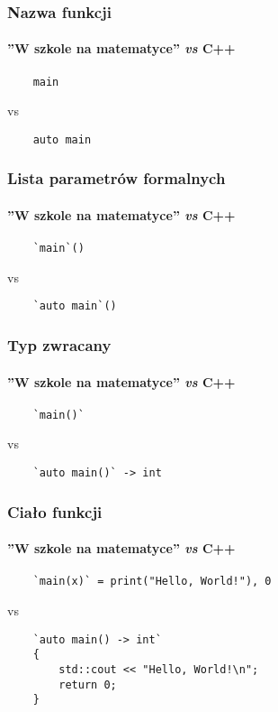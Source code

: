 \documentclass[aspectratio=169]{beamer}
\begin{document}
\begin{frame}[fragile]
    \frametitle{Nazwa funkcji}
    \framesubtitle{''W szkole na matematyce'' \emph{vs} C++}

    {\footnotesize
    \begin{lstlisting}
    main
    \end{lstlisting}}

    vs

    {\footnotesize
    \begin{lstlisting}
    auto main
    \end{lstlisting}}
    \vspace{4em}
\end{frame}

\begin{frame}[fragile]
    \frametitle{Lista parametrów formalnych}
    \framesubtitle{''W szkole na matematyce'' \emph{vs} C++}

    {\footnotesize
    \begin{lstlisting}
    `main`()
    \end{lstlisting}}

    vs

    {\footnotesize
    \begin{lstlisting}
    `auto main`()
    \end{lstlisting}}
    \vspace{4em}
\end{frame}

\begin{frame}[fragile]
    \frametitle{Typ zwracany}
    \framesubtitle{''W szkole na matematyce'' \emph{vs} C++}

    {\footnotesize
    \begin{lstlisting}
    `main()`
    \end{lstlisting}}

    vs

    {\footnotesize
    \begin{lstlisting}
    `auto main()` -> int
    \end{lstlisting}}
    \vspace{4em}
\end{frame}

\begin{frame}[fragile]
    \frametitle{Ciało funkcji}
    \framesubtitle{''W szkole na matematyce'' \emph{vs} C++}

    {\footnotesize
    \begin{lstlisting}
    `main(x)` = print("Hello, World!"), 0
    \end{lstlisting}}

    vs

    {\footnotesize
    \begin{lstlisting}
    `auto main() -> int`
    {
        std::cout << "Hello, World!\n";
        return 0;
    }
    \end{lstlisting}}
\end{frame}
\end{document}
